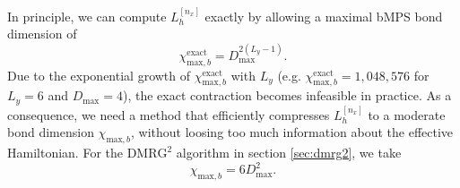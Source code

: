 \noindent In principle, we can compute $L_h^{[n_x]}$ exactly by allowing a maximal bMPS bond dimension of
\begin{equation}
	\chi_{\text{max}, b}^{\text{exact}} = D_{\text{max}}^{2(L_y-1)}.
\end{equation}
Due to the exponential growth of $\chi_{\text{max}, b}^{\text{exact}}$ with $L_y$ (e.g. $\chi_{\text{max}, b}^{\text{exact}} = 1,048,576$ for $L_y = 6$ and $D_{\text{max}} = 4$), the exact contraction becomes infeasible in practice. As a consequence, we need a method that efficiently compresses $L_h^{[n_x]}$ to a moderate bond dimension $\chi_{\text{max}, b}$, without loosing too much information about the effective Hamiltonian. For the $\text{DMRG}^2$ algorithm in section \ref{sec:dmrg2}, we take
\begin{equation}
	\chi_{\text{max}, b} = 6 D_{\text{max}}^{2}.
\end{equation}

\vspace*{2em}

